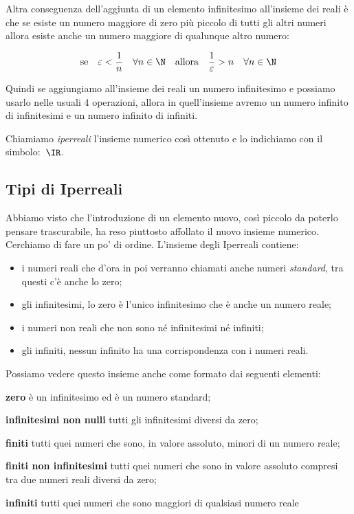 Altra conseguenza dell'aggiunta di un elemento infinitesimo all'insieme dei 
reali è che se esiste un numero maggiore di zero più piccolo di tutti gli 
altri 
numeri allora esiste anche un numero maggiore di qualunque altro numero:

\[\text{se} \quad \varepsilon < \frac{1}{n} \quad \forall n \in \N 
\quad \text{allora} \quad \frac{1}{\varepsilon} > n \quad \forall n 
\in \N\]

Quindi se aggiungiamo all'insieme dei reali un numero infinitesimo e possiamo 
usarlo nelle usuali 4 operazioni, allora in quell'insieme avremo un 
numero infinito di infinitesimi e un numero infinito di infiniti.

Chiamiamo \emph{iperreali} l'insieme numerico così ottenuto e lo indichiamo 
con 
il simbolo:~$\IR$.

\subsection{Tipi di Iperreali}
\label{subsec:insnum_iperreali}

Abbiamo visto che l'introduzione di un elemento nuovo, così piccolo
da poterlo pensare trascurabile, ha 
reso piuttosto affollato il nuovo insieme numerico. Cerchiamo di fare un po' 
di ordine. L'insieme degli Iperreali contiene:

\begin{itemize} [noitemsep]
 \item i numeri reali che d'ora in poi verranno chiamati anche numeri 
\emph{standard}, tra questi c'è anche lo zero;
 \item gli infinitesimi, lo zero è l'unico infinitesimo che è anche un numero 
reale;
 \item i numeri non reali che non sono né infinitesimi né infiniti;
 \item gli infiniti, nessun infinito ha una corrispondenza con i numeri reali.
\end{itemize}

Possiamo vedere questo insieme anche come formato dai seguenti elementi:

\begin{description} [noitemsep]
 \item \textbf{zero}
 è un infinitesimo ed è un numero standard;
 \item \textbf{infinitesimi non nulli}
 tutti gli infinitesimi diversi da zero;
 \item \textbf{finiti}
 tutti quei numeri che sono, in valore assoluto, minori di un numero reale;
 \item \textbf{finiti non infinitesimi}
 tutti quei numeri che sono in valore assoluto compresi tra due numeri reali 
 diversi da zero;
 \item \textbf{infiniti}
 tutti quei numeri che sono maggiori di qualsiasi numero reale

\end{description}
 
